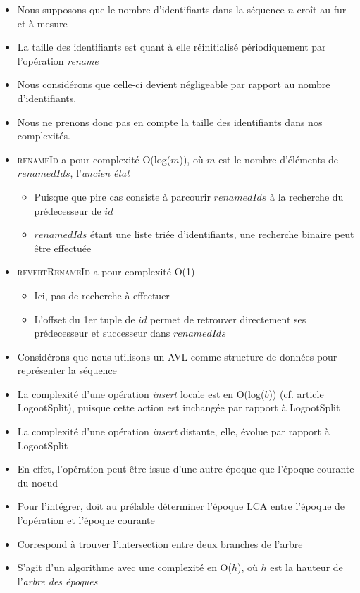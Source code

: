 \documentclass[12pt]{thesul}
\begin{document}
\begin{itemize}
  \item Nous supposons que le nombre d'identifiants dans la séquence $n$ croît au fur et à mesure
  \item La taille des identifiants est quant à elle réinitialisé périodiquement par l'opération \emph{rename}
  \item Nous considérons que celle-ci devient négligeable par rapport au nombre d'identifiants.
  \item Nous ne prenons donc pas en compte la taille des identifiants dans nos complexités.
  \item \textsc{renameId} a pour complexité O(log($m$)), où $m$ est le nombre d'éléments de $renamedIds$, l'\emph{ancien état}
  \begin{itemize}
    \item Puisque que pire cas consiste à parcourir $renamedIds$ à la recherche du prédecesseur de $id$
    \item $renamedIds$ étant une liste triée d'identifiants, une recherche binaire peut être effectuée
  \end{itemize}
  \item \textsc{revertRenameId} a pour complexité O(1)
  \begin{itemize}
    \item Ici, pas de recherche à effectuer
    \item L'offset du 1er tuple de $id$ permet de retrouver directement ses prédecesseur et successeur dans $renamedIds$
  \end{itemize}
  \item Considérons que nous utilisons un AVL comme structure de données pour représenter la séquence
  \item La complexité d'une opération \emph{insert} locale est en O(log($b$)) (cf. article LogootSplit), puisque cette action est inchangée par rapport à LogootSplit
  \item La complexité d'une opération \emph{insert} distante, elle, évolue par rapport à LogootSplit
  \item En effet, l'opération peut être issue d'une autre époque que l'époque courante du noeud
  \item Pour l'intégrer, doit au prélable déterminer l'époque \ac{LCA} entre l'époque de l'opération et l'époque courante
  \item Correspond à trouver l'intersection entre deux branches de l'arbre
  \item S'agit d'un algorithme avec une complexité en O($h$), où $h$ est la hauteur de l'\emph{arbre des époques}

\end{itemize}
\end{document}
